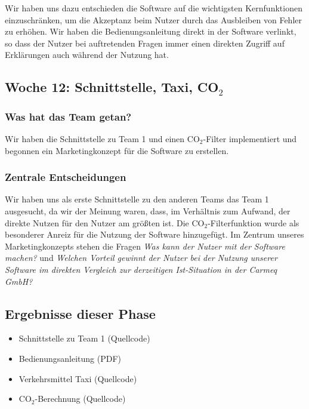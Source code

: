 \documentclass{article}
\begin{document}
Wir haben uns dazu entschieden die Software auf die wichtigsten Kernfunktionen einzuschr\"anken, um die Akzeptanz beim Nutzer durch das Ausbleiben von Fehler zu erh\"ohen. Wir haben die Bedienungsanleitung direkt in der Software verlinkt, so dass der Nutzer bei auftretenden Fragen immer einen direkten Zugriff auf Erkl\"arungen auch w\"ahrend der Nutzung hat.


\subsection{Woche 12: Schnittstelle, Taxi, CO$_2$}

\subsubsection{Was hat das Team getan?}

Wir haben die Schnittstelle zu Team 1 und einen CO$_2$-Filter implementiert und begonnen ein Marketingkonzept f\"ur die Software zu erstellen.

\subsubsection{Zentrale Entscheidungen}

Wir haben uns als erste Schnittstelle zu den anderen Teams das Team 1 ausgesucht, da wir der Meinung waren, dass, im Verh\"altnis zum Aufwand, der direkte Nutzen f\"ur den Nutzer am gr\"o\ss ten ist. Die CO$_2$-Filterfunktion wurde als besonderer Anreiz f\"ur die Nutzung der Software hinzugef\"ugt. Im Zentrum unseres Marketingkonzepts stehen die Fragen \textit{Was kann der Nutzer mit der Software machen?} und \textit{Welchen Vorteil gewinnt der Nutzer bei der Nutzung unserer Software im direkten Vergleich zur derzeitigen Ist-Situation in der Carmeq GmbH?}

\subsection{Ergebnisse dieser Phase}

\begin{itemize}
\item Schnittstelle zu Team 1 (Quellcode)
\item Bedienungsanleitung (PDF)
\item Verkehrsmittel Taxi (Quellcode)
\item CO$_2$-Berechnung (Quellcode)
\end{itemize}
\end{document}
